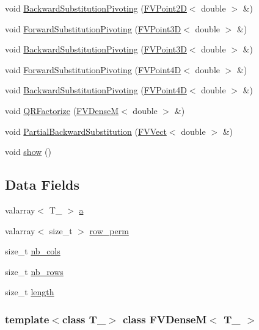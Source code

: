 \begin{DoxyCompactItemize}
\item 
void \hyperlink{classFVDenseM_af0e30762af46f60b2e6dc4cbabdbb4bd}{BackwardSubstitutionPivoting} (\hyperlink{classFVPoint2D}{FVPoint2D}$<$ double $>$ \&)
\item 
void \hyperlink{classFVDenseM_adbc33db602247330e73b05ecef74678f}{ForwardSubstitutionPivoting} (\hyperlink{classFVPoint3D}{FVPoint3D}$<$ double $>$ \&)
\item 
void \hyperlink{classFVDenseM_aebf5f34295c995ea440e913e0e27c32d}{BackwardSubstitutionPivoting} (\hyperlink{classFVPoint3D}{FVPoint3D}$<$ double $>$ \&)
\item 
void \hyperlink{classFVDenseM_a5b48ed3d6cb0251084e6b6e5b7a261fc}{ForwardSubstitutionPivoting} (\hyperlink{classFVPoint4D}{FVPoint4D}$<$ double $>$ \&)
\item 
void \hyperlink{classFVDenseM_ae3fa5328eff5ad4ebe01c8723ea8b26c}{BackwardSubstitutionPivoting} (\hyperlink{classFVPoint4D}{FVPoint4D}$<$ double $>$ \&)
\item 
void \hyperlink{classFVDenseM_ab0d4d86f44473b25724ef76ddd5663a1}{QRFactorize} (\hyperlink{classFVDenseM}{FVDenseM}$<$ double $>$ \&)
\item 
void \hyperlink{classFVDenseM_ae006829f93858c6796e73533c1784e9e}{PartialBackwardSubstitution} (\hyperlink{classFVVect}{FVVect}$<$ double $>$ \&)
\item 
void \hyperlink{classFVDenseM_a4b148f40a95444d5669406b918ad2f52}{show} ()
\end{DoxyCompactItemize}
\subsection*{Data Fields}
\begin{DoxyCompactItemize}
\item 
valarray$<$ T\_\- $>$ \hyperlink{classFVDenseM_a79134a5b7e0d6acf861da02da21d735e}{a}
\item 
valarray$<$ size\_\-t $>$ \hyperlink{classFVDenseM_a8c10fbbfbdfafbb79c6856b23415ec4f}{row\_\-perm}
\item 
size\_\-t \hyperlink{classFVDenseM_a4451904bc3a87b7e94ba9967cfe5acc9}{nb\_\-cols}
\item 
size\_\-t \hyperlink{classFVDenseM_a660778a5412448cf6b641e67d1d70011}{nb\_\-rows}
\item 
size\_\-t \hyperlink{classFVDenseM_ae809d5359ac030c60a30a8f0b2294b82}{length}
\end{DoxyCompactItemize}
\subsubsection*{template$<$class T\_\-$>$ class FVDenseM$<$ T\_\- $>$}




